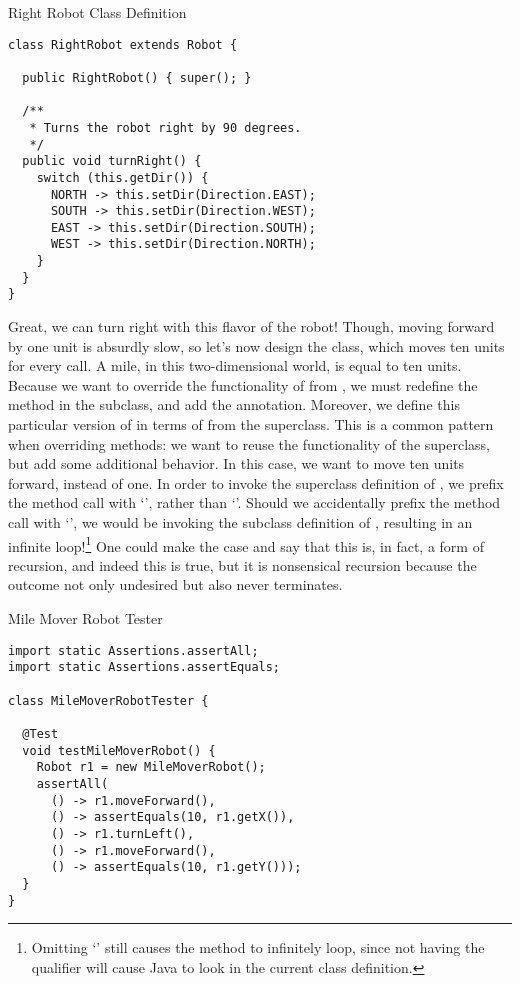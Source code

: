\begin{cl}{Right Robot Class Definition}
\begin{lstlisting}[language=MyJava]
class RightRobot extends Robot {

  public RightRobot() { super(); }

  /**
   * Turns the robot right by 90 degrees.
   */
  public void turnRight() {
    switch (this.getDir()) {
      NORTH -> this.setDir(Direction.EAST);
      SOUTH -> this.setDir(Direction.WEST);
      EAST -> this.setDir(Direction.SOUTH);
      WEST -> this.setDir(Direction.NORTH);
    }
  }
}
\end{lstlisting}
\end{cl}

Great, we can turn right with this flavor of the robot! Though, moving forward by one unit is absurdly slow, so let's now design the  class, which moves ten units for every  call. A mile, in this two-dimensional world, is equal to ten units. Because we want to override the functionality of  from , we must redefine the method in the subclass, and add the  annotation. Moreover, we define this particular version of  in terms of  from the superclass. This is a common pattern when overriding methods: we want to reuse the functionality of the superclass, but add some additional behavior. In this case, we want to move ten units forward, instead of one. In order to invoke the superclass definition of , we prefix the method call with `', rather than `'. Should we accidentally prefix the method call with `', we would be invoking the subclass definition of , resulting in an infinite loop!\footnote{Omitting `' still causes the method to infinitely loop, since not having the qualifier will cause Java to look in the current class definition.} One could make the case and say that this is, in fact, a form of recursion, and indeed this is true, but it is nonsensical recursion because the outcome not only undesired but also never terminates.

\begin{cl}{Mile Mover Robot Tester}
\begin{lstlisting}[language=MyJava]
import static Assertions.assertAll;
import static Assertions.assertEquals;

class MileMoverRobotTester {

  @Test
  void testMileMoverRobot() {
    Robot r1 = new MileMoverRobot();
    assertAll(
      () -> r1.moveForward(),
      () -> assertEquals(10, r1.getX()),
      () -> r1.turnLeft(),
      () -> r1.moveForward(),
      () -> assertEquals(10, r1.getY()));
  }
}
\end{lstlisting}
\end{cl}

